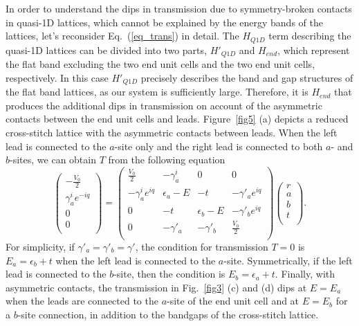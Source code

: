 \documentclass[twocolumn,showpacs,epsfig,pre]{revtex4}
\begin{document}
In order to understand the dips in transmission due to symmetry-broken contacts in quasi-1D lattices, which cannot be explained by the energy bands of the lattices, let's reconsider Eq.~(\ref{eq_trans}) in detail. The $H_{Q1D}$ term describing the quasi-1D lattices can be divided into two parts, $H'_{Q1D}$ and $H_{end}$, which represent the flat band excluding the two end unit cells and the two end unit cells, respectively.
In this case $H'_{Q1D}$ precisely describes the band and gap structures of the flat band lattices, as our system is sufficiently large.
Therefore, it is $H_{end}$ that produces the additional dips in transmission on account of the asymmetric contacts between the end unit cells and leads.
Figure~\ref{fig5} (a) depicts a reduced cross-stitch lattice with the asymmetric contacts between leads.
When the left lead is connected to the $a$-site only and the right lead is connected to both $a$- and $b$-sites, we can obtain $T$ from the following equation
\begin{equation}
 \left(\begin{array}{c}
 -\frac{V_0}{2} \\
 \gamma_a^{i} e^{-i q} \\
 0 \\
 0 \\
\end{array}\right)=
 \left(\begin{array}{cccc} 	
 \frac{V_0}{2} & -\gamma_a^{i} & 0 & 0 \\
 -\gamma_a^{i} e^{i q} & \epsilon_a - E & -t & -\gamma'_a e^{i q}  \\
 0 & -t & \epsilon_b - E & -\gamma'_b e^{i q} \\
 0 & -\gamma'_a & -\gamma'_b & \frac{V_0}{2} \\
\end{array}\right)
\left(\begin{array}{c}
 r \\
 a \\
 b \\
 t \\
\end{array}\right).
\end{equation}
For simplicity, if $\gamma'_a=\gamma'_b=\gamma'$, the condition for transmission $T=0$ is $E_a = \epsilon_b + t$ when the left lead is connected to the $a$-site. Symmetrically, if the left lead is connected to the $b$-site, then the condition is $E_b = \epsilon_a + t$.
Finally, with asymmetric contacts, the transmission in Fig.~\ref{fig3} (c) and (d) dips at $E=E_a$ when the leads are connected to the $a$-site of the end unit cell and at $E=E_b$ for a $b$-site connection, in addition to the bandgaps of the cross-stitch lattice.
\end{document}
